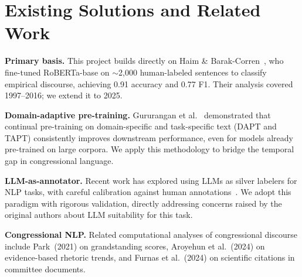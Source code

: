\documentclass[11pt,a4paper]{article}
\begin{document}
\section{Existing Solutions and Related Work}

\textbf{Primary basis.} This project builds directly on Haim \& Barak-Corren~\cite{haim2026}, who fine-tuned RoBERTa-base on $\sim$2,000 human-labeled sentences to classify empirical discourse, achieving 0.91 accuracy and 0.77 F1. Their analysis covered 1997--2016; we extend it to 2025.

\textbf{Domain-adaptive pre-training.} Gururangan et al.~\cite{gururangan2020} demonstrated that continual pre-training on domain-specific and task-specific text (DAPT and TAPT) consistently improves downstream performance, even for models already pre-trained on large corpora. We apply this methodology to bridge the temporal gap in congressional language.

\textbf{LLM-as-annotator.} Recent work has explored using LLMs as silver labelers for NLP tasks, with careful calibration against human annotations~\cite{gilardi2023chatgpt, he2024annollm}. We adopt this paradigm with rigorous validation, directly addressing concerns raised by the original authors about LLM suitability for this task.

\textbf{Congressional NLP.} Related computational analyses of congressional discourse include Park~(2021) on grandstanding scores, Aroyehun et al.~(2024) on evidence-based rhetoric trends, and Furnas et al.~(2024) on scientific citations in committee documents.


\end{document}
